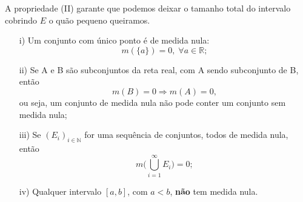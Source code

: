 \documentclass[../analysisII_notes.tex]{subfiles}
\begin{document}
A propriedade (II) garante que podemos deixar o tamanho total do intervalo cobrindo \(E\) o quão pequeno queiramos.
\begin{prop*}
	\begin{itemize}
		\item[i)] Um conjunto com único ponto é de medida nula:
		      \[
			      m(\{a\}) = 0,\; \forall a\in \mathbb{R};
		      \]
		\item[ii)] Se A e B são subconjuntos da reta real, com A sendo subconjunto de B, então
		      \[
			      m(B) = 0 \Rightarrow m(A) = 0,
		      \]
		      ou seja, um conjunto de medida nula não pode conter um conjunto sem medida nula;
		\item[iii)] Se \((E_{i})_{i\in \mathbb{N}}\) for uma sequência de conjuntos, todos de medida nula, então
		      \[
			      m \biggl(\bigcup_{i=1}^{\infty}E_{i}\biggr) = 0;
		      \]
		\item[iv)] Qualquer intervalo \([a, b]\), com \(a < b\), \textbf{não} tem medida nula.
	\end{itemize}
\end{prop*}
\end{document}
